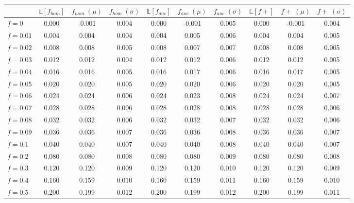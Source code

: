 \begin{tabular}{lccccccccc}
\toprule
 & $\mathbb{E}[f_{hom}]$ & $f_{hom} \;(\mu)$ & $f_{hom} \;(\sigma)$ & $\mathbb{E}[f_{anc}]$ & $f_{anc} \;(\mu)$ & $f_{anc} \;(\sigma)$ & $\mathbb{E}[f+]$ & $f+ \;(\mu)$ & $f+ \;(\sigma)$ \\
\midrule
$f = 0$ & 0.000 & -0.001 & 0.004 & 0.000 & -0.001 & 0.005 & 0.000 & -0.001 & 0.004 \\
$f = 0.01$ & 0.004 & 0.004 & 0.004 & 0.004 & 0.005 & 0.006 & 0.004 & 0.004 & 0.005 \\
$f = 0.02$ & 0.008 & 0.008 & 0.005 & 0.008 & 0.007 & 0.007 & 0.008 & 0.008 & 0.005 \\
$f = 0.03$ & 0.012 & 0.012 & 0.004 & 0.012 & 0.012 & 0.006 & 0.012 & 0.012 & 0.005 \\
$f = 0.04$ & 0.016 & 0.016 & 0.005 & 0.016 & 0.017 & 0.006 & 0.016 & 0.017 & 0.005 \\
$f = 0.05$ & 0.020 & 0.020 & 0.005 & 0.020 & 0.020 & 0.006 & 0.020 & 0.020 & 0.005 \\
$f = 0.06$ & 0.024 & 0.024 & 0.006 & 0.024 & 0.023 & 0.008 & 0.024 & 0.024 & 0.007 \\
$f = 0.07$ & 0.028 & 0.028 & 0.006 & 0.028 & 0.028 & 0.008 & 0.028 & 0.028 & 0.006 \\
$f = 0.08$ & 0.032 & 0.032 & 0.006 & 0.032 & 0.032 & 0.007 & 0.032 & 0.032 & 0.006 \\
$f = 0.09$ & 0.036 & 0.036 & 0.007 & 0.036 & 0.036 & 0.008 & 0.036 & 0.036 & 0.007 \\
$f = 0.1$ & 0.040 & 0.040 & 0.007 & 0.040 & 0.040 & 0.008 & 0.040 & 0.040 & 0.007 \\
$f = 0.2$ & 0.080 & 0.080 & 0.008 & 0.080 & 0.080 & 0.009 & 0.080 & 0.080 & 0.008 \\
$f = 0.3$ & 0.120 & 0.120 & 0.009 & 0.120 & 0.120 & 0.010 & 0.120 & 0.120 & 0.009 \\
$f = 0.4$ & 0.160 & 0.159 & 0.010 & 0.160 & 0.159 & 0.011 & 0.160 & 0.159 & 0.010 \\
$f = 0.5$ & 0.200 & 0.199 & 0.012 & 0.200 & 0.199 & 0.012 & 0.200 & 0.199 & 0.011 \\
\bottomrule
\end{tabular}
